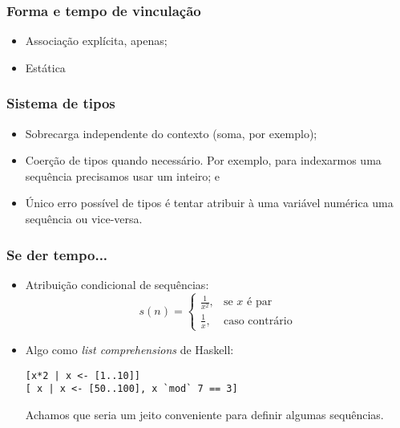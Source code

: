 \documentclass{beamer}
\begin{document}
\begin{frame}[fragile]
  \frametitle{Forma e tempo de vincula\c c\~ao}
  \begin{itemize}
  \item Associa\c c\~ao expl\'icita, apenas;
  \item Est\'atica
  \end{itemize}
\end{frame}

\begin{frame}[fragile]
  \frametitle{Sistema de tipos}
  \begin{itemize}
  \item Sobrecarga independente do contexto (soma, por exemplo);
  \item Coer\c c\~ao de tipos quando necess\'ario. Por exemplo, para
    indexarmos uma sequ\^encia precisamos usar um inteiro; e
  \item \'Unico erro poss\'ivel de tipos \'e tentar atribuir \`a uma
    vari\'avel num\'erica uma sequ\^encia ou vice-versa.
  \end{itemize}
\end{frame}

\begin{frame}[fragile]
  \frametitle{Se der tempo...}
  \begin{itemize}
  \item Atribui\c c\~ao condicional de sequ\^encias:
\[
s(n) =
\begin{cases}
  \frac{1}{x ^ 2}, & \text{se $x$ \'e par}\\
  \frac{1}{x}, & \text{caso contr\'ario}
\end{cases}
\]
\item Algo como \emph{list comprehensions} de Haskell:
\begin{verbatim}
[x*2 | x <- [1..10]]
[ x | x <- [50..100], x `mod` 7 == 3]
\end{verbatim}
Achamos que seria um jeito conveniente para definir algumas sequ\^encias.
  \end{itemize}
\end{frame}
\end{document}
